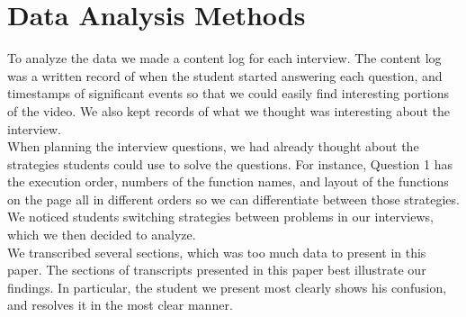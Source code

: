 \section{Data Analysis Methods}

To analyze the data we made a content log for each interview.
The content log was a written record of when the student started answering each question,
 and timestamps of significant events so that we could easily find interesting portions of the video.
We also kept records of what we thought was interesting about the interview. \\

When planning the interview questions, we had already thought about the strategies students could use to solve the questions.
For instance, Question 1 has the execution order, numbers of the function names,
 and layout of the functions on the page all in different orders so we can differentiate between those strategies.
We noticed students switching strategies between problems in our interviews, which we then decided to analyze. \\

We transcribed several sections, which was too much data to present in this paper.
The sections of transcripts presented in this paper best illustrate our findings.
In particular, the student we present most clearly shows his confusion, and resolves it in the most clear manner.

\newpage
